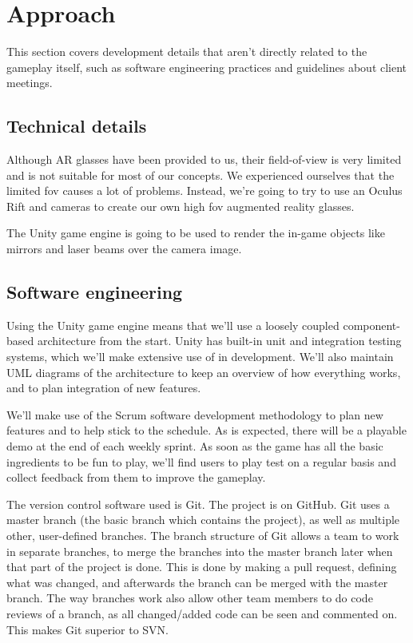 \section{Approach}

This section covers development details that aren't directly related to the
gameplay itself, such as software engineering practices and guidelines about
client meetings.

\subsection{Technical details}

Although AR glasses have been provided to us, their field-of-view is very
limited and is not suitable for most of our concepts. We experienced ourselves
that the limited fov causes a lot of problems. Instead, we're going to try to
use an Oculus Rift and cameras to create our own high fov augmented reality
glasses.

The Unity game engine is going to be used to render the in-game objects like
mirrors and laser beams over the camera image.

\subsection{Software engineering}

Using the Unity game engine means that we'll use a loosely coupled
component-based architecture from the start. Unity has built-in unit and
integration testing systems, which we'll make extensive use of in development.
We'll also maintain UML diagrams of the architecture to keep an overview of how
everything works, and to plan integration of new features.

We'll make use of the Scrum software development methodology to plan new
features and to help stick to the schedule. As is expected, there will be a
playable demo at the end of each weekly sprint. As soon as the game has all the
basic ingredients to be fun to play, we'll find users to play test on a regular
basis and collect feedback from them to improve the gameplay.

The version control software used is Git. The project is on GitHub. Git uses a master branch (the 
basic branch which contains the project), as well as multiple other, user-defined branches.
The branch structure of Git allows a team to work in separate branches, to merge the branches 
into the master branch later when that part of the project is done. This is done by making 
a pull request, defining what was changed, and afterwards the branch can be merged with the master branch.
The way branches work also allow other team members to do code reviews of a branch, as all changed/added
code can be seen and commented on. This makes Git superior to SVN.

